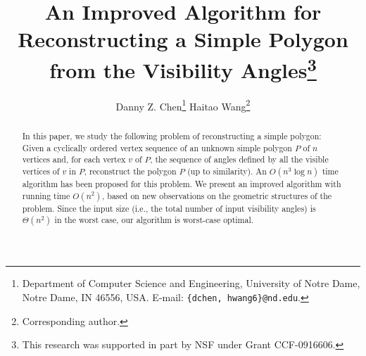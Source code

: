 \documentclass[11pt]{article}
\def\sectionspace{\vspace*{0in}}
\begin{document}
\baselineskip=14.0pt

\title{
\vspace*{-0.55in} An Improved Algorithm for Reconstructing a Simple
Polygon from the Visibility Angles\thanks{This research was
supported in part by NSF under Grant CCF-0916606.}}

\author{
Danny Z. Chen\thanks{Department of Computer Science and Engineering,
University of Notre Dame, Notre Dame, IN 46556, USA.
E-mail: {\tt \{dchen, hwang6\}@nd.edu}.
}
\hspace*{0.2in} Haitao Wang\footnotemark[2] \thanks{Corresponding
author.
}}


\date{}

\maketitle

\thispagestyle{empty}

\newtheorem{lemma}{Lemma}
\newtheorem{theorem}{Theorem}
\newtheorem{corollary}{Corollary}
\newtheorem{fact}{Fact}
\newtheorem{definition}{Definition}
\newtheorem{observation}{Observation}
\newtheorem{condition}{Condition}
\newtheorem{property}{Property}
\newtheorem{claim}{Claim}
\newenvironment{proof}{\noindent {\textbf{Proof:}}\rm}{\hfill $\Box$
\rm}


\pagestyle{plain}
\setcounter{page}{1}

\vspace*{-0.2in}
\begin{abstract}
In this paper, we study the following problem of reconstructing a
simple polygon: Given a cyclically 
ordered vertex sequence of an unknown simple polygon $P$ of $n$ vertices and, for each vertex
$v$ of $P$, the sequence of angles defined by all the visible vertices of $v$ in $P$,
reconstruct the polygon $P$ (up to
similarity). An $O(n^3\log n)$
time algorithm has been proposed for this problem. 
We present an improved algorithm 
with running time $O(n^2)$,
based on new observations on the geometric structures of the problem.
Since the input size (i.e., the total number of input visibility angles) is
$\Theta(n^2)$ in the worst case, our algorithm is worst-case optimal. 
\end{abstract}



\sectionspace
\end{document}
